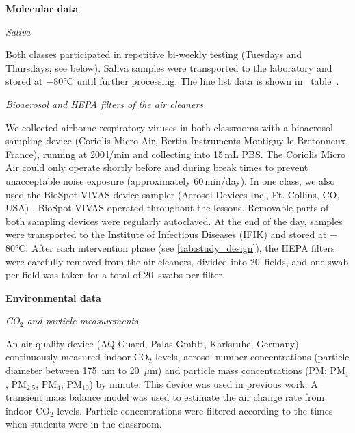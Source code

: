 \documentclass[fleqn,11pt]{wlscirep}
\begin{document}
\noindent\textbf{Molecular data} \smallskip

\noindent \emph{Saliva} \smallskip

\noindent Both classes participated in repetitive bi-weekly testing (Tuesdays and Thursdays; see  below). Saliva samples were transported to the laboratory and stored at $-$80°C until further processing\cite{Galar2021,To2019,Huber2021}. The line list data is shown in \supp~table~. \medskip

\noindent \emph{Bioaerosol and HEPA filters of the air cleaners} \smallskip

\noindent We collected airborne respiratory viruses in both classrooms with a bioaerosol sampling device (Coriolis Micro Air, Bertin Instruments Montigny-le-Bretonneux, France), running at 200\,l/min and collecting into 15\,mL PBS. The Coriolis Micro Air could only operate shortly before and during break times to prevent unacceptable noise exposure (approximately 60\,min/day). In one class, we also used the BioSpot-VIVAS device sampler (Aerosol Devices Inc., Ft. Collins, CO, USA) \cite{Pan2016JAM,Lednicky2016AST}. BioSpot-VIVAS operated throughout the lessons. Removable parts of both sampling devices were regularly autoclaved. At the end of the day, samples were transported to the Institute of Infectious Diseases (IFIK) and stored at $-$80°C. After each intervention phase (see \cref{tab:study_design}), the HEPA filters were carefully removed from the air cleaners, divided into 20~fields, and one swab per field was taken for a total of 20~swabs per filter. \medskip

\noindent\textbf{Environmental data} \smallskip

\noindent \emph{CO$_2$ and particle measurements} 

\noindent An air quality device (AQ Guard, Palas GmbH, Karlsruhe, Germany) continuously measured indoor CO$_2$ levels, aerosol number concentrations (particle diameter between 175~nm to 20~$\mu$m) and particle mass concentrations (PM; PM$_1$, PM$_{2.5}$, PM$_4$, PM$_{10}$) by minute. This device was used in previous work\cite{DiGilio2021,Duill2021,Banholzer2023PLoSMed}. A transient mass balance model was used to estimate the air change rate from indoor CO$_2$ levels\cite{Batterman2017IJERPH}.%
Particle concentrations were filtered according to the times when students were in the classroom. %
\end{document}
